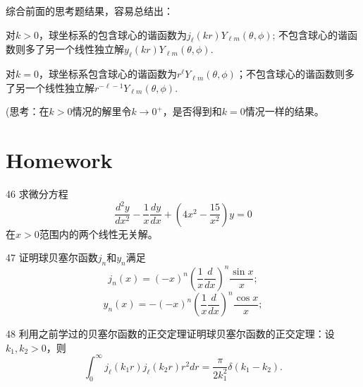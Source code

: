\documentclass[CJK]{beamer}
\begin{document}
\begin{frame}
  \bch

  综合前面的思考题结果，容易总结出：
  \bitem
\item{\blue 对$k>0$，球坐标系的包含球心的谐函数为$j_\ell(kr)Y_{\ell m}(\theta, \phi)$; 不包含球心的谐函数则多了另一个线性独立解$y_\ell(kr)Y_{\ell m}(\theta, \phi)$.}
\item{\blue 对$k=0$，球坐标系包含球心的谐函数为$r^\ell Y_{\ell m}(\theta,\phi)$；不包含球心的谐函数则多了另一个线性独立解$r^{-\ell -1}Y_{\ell m}(\theta,\phi)$.}
  \eitem

  (思考：在$k>0$情况的解里令$k\rightarrow 0^+$，是否得到和$k=0$情况一样的结果。
  \ech
\end{frame}



\section{Homework}

\begin{frame}
\bch
\bitem
\item[46]{求微分方程
  $$ \frac{d^2y}{dx^2} -\frac{1}{x}\frac{dy}{dx} + \left(4x^2-\frac{15}{x^2}\right)y = 0$$
  在$x>0$范围内的两个线性无关解。}
\item[47]{证明球贝塞尔函数$j_n$和$y_n$满足
  $$ j_n(x) = (-x)^n\left(\frac{1}{x}\frac{d}{dx}\right)^n\frac{\sin x}{x}; $$
  $$ y_n(x) = -(-x)^n\left(\frac{1}{x}\frac{d}{dx}\right)^n\frac{\cos x}{x}; $$}
\item[48]{利用之前学过的贝塞尔函数的正交定理证明球贝塞尔函数的正交定理：设$k_1, k_2>0$，则
  $$\int_0^\infty j_{\ell}(k_1r)j_{\ell}(k_2r) r^2 dr = \frac{\pi}{2k_1^2} \delta(k_1-k_2).$$}
 
  \eitem
\ech
\end{frame}
\end{document}

